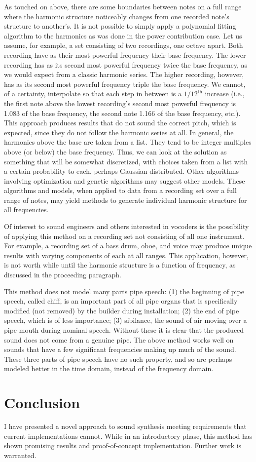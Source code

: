 \documentclass[twocolumn]{article}
\begin{document}
As touched on above, there are some boundaries between notes on a full range where the harmonic structure noticeably changes from one recorded note's structure to another's. It is not possible to simply apply a polynomial fitting algorithm to the harmonics as was done in the power contribution case. Let us assume, for example, a set consisting of two recordings, one octave apart. Both recording have as their most powerful frequency their base frequency. The lower recording has as its second most powerful frequency twice the base frequency, as we would expect from a classic harmonic series. The higher recording, however, has as its second most powerful frequency triple the base frequency. We cannot, of a certainty, interpolate so that each step in between is a $1/12^\mathrm{th}$ increase (i.e., the first note above the lowest recording's second most powerful frequency is 1.083 of the base frequency, the second note 1.166 of the base frequency, etc.). This approach produces results that do not sound the correct pitch, which is expected, since they do not follow the harmonic series at all. In general, the harmonics above the base are taken from a list. They tend to be integer multiples above (or below) the base frequency. Thus, we can look at the solution as something that will be somewhat discretized, with choices taken from a list with a certain probability to each, perhaps Gaussian distributed. Other algorithms involving optimization and genetic algorithms may suggest other models. These algorithms and models, when applied to data from a recording set over a full range of notes, may yield methods to generate individual harmonic structure for all frequencies.

Of interest to sound engineers and others interested in vocoders is the possibility of applying this method on a recording set not consisting of all one instrument. For example, a recording set of a bass drum, oboe, and voice may produce unique results with varying components of each at all ranges. This application, however, is not worth while until the harmonic structure is a function of frequency, as discussed in the proceeding paragraph.

This method does not model many parts pipe speech: (1) the beginning of pipe speech, called chiff, is an important part of all pipe organs that is specifically modified (not removed) by the builder during installation; (2) the end of pipe speech, which is of less importance; (3) sibilance, the sound of air moving over a pipe mouth during nominal speech. Without these it is clear that the produced sound does not come from a genuine pipe. The above method works well on sounds that have a few significant frequencies making up much of the sound. These three parts of pipe speech have no such property, and so are perhaps modeled better in the time domain, instead of the frequency domain.

\section{Conclusion}

I have presented a novel approach to sound synthesis meeting requirements that current implementations cannot. While in an introductory phase, this method has shown promising results and proof-of-concept implementation. Further work is warranted.
\end{document}
